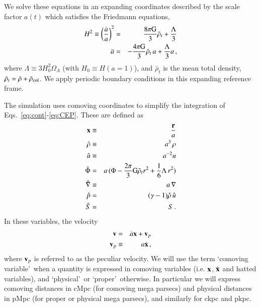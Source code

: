 We solve these equations in an expanding coordinates described by the scale factor $a(t)$ which satisfies the Friedmann equations,
\begin{eqnarray}
H^2 \equiv \left({{\dot a}\over a}\right)^2 &=& {8\pi {\rm G}\over 3}\bar\rho_t+ {\Lambda\over 3}\\
\ddot a &=& -{4\pi {\rm G}\over 3}\bar\rho_t\,a + {\Lambda\over 3}a\,,
\end{eqnarray}
where $\Lambda\equiv 3H_0^2\Omega_\Lambda$ (with $H_0\equiv H(a=1)$), and $\bar\rho_t$ is the mean total density, $\bar\rho_t = \bar\rho + \bar\rho_{\rm col}$. We apply periodic boundary conditions in this expanding reference frame.

The simulation uses comoving coordinates to simplify the integration of Eqs.~\ref{eq:cont}-\ref{eq:CEP}. These are defined as
\begin{eqnarray}
{\bf x}&\equiv & {{\bf r}\over a}\\
\hat \rho &\equiv & a^3\,\rho\\
\hat u &\equiv& a^{-2}u\\
\hat\Phi &=& a\,(\Phi -{2\pi\over 3}{\rm G}\bar\rho_t r^2 + {1\over 6}\Lambda\,r^2)\\
\hat\nabla &\equiv &a\,\nabla\\
\hat p &=& (\gamma-1)\hat \rho\,\hat u\\
\hat S &=& S\,.
\label{eq:covar}
\end{eqnarray}
In these variables, the velocity
\begin{eqnarray}
{\bf v} &=& \dot a {\bf x} + {\bf v}_p\\
{\bf v}_p & \equiv & a \dot{\bf x}\,,
\label{eq:v_p}
\end{eqnarray}
where ${\bf v}_p$ is referred to as the peculiar velocity. We will use the term \lq comoving variable\rq\ when a quantity is expressed in comoving variables (i.e. ${\bf x}$, $\dot{\bf x}$ and hatted variables), and \lq physical\rq\ or \lq proper\rq\ otherwise. In particular we will express comoving distances in cMpc (for comoving mega parsecs) and physical distances in pMpc (for proper or physical mega parsecs), and similarly for ckpc and pkpc.

